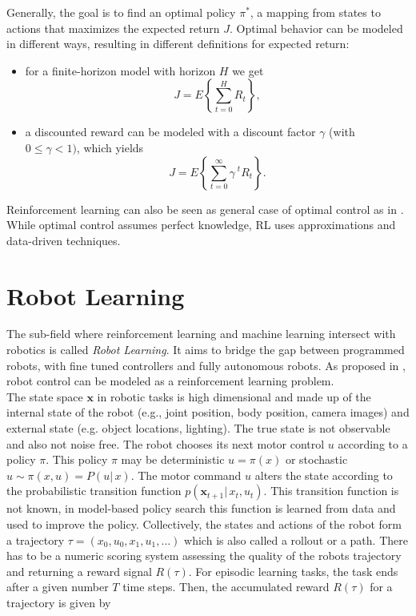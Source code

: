 Generally, the goal is to find an optimal policy $\pi^*$,
a mapping from states to actions that
maximizes the expected return $J$.
Optimal behavior can be modeled in
different ways, resulting in different
definitions for expected return:
\begin{itemize}
\item for a finite-horizon model with horizon $H$ we get
$$ J = E \left\{\sum^H_{t=0} R_t \right\}, $$

\item a discounted reward can be modeled with
  a discount factor $\gamma$ (with $0 \leq \gamma < 1)$, which yields
$$ J = E \left\{\sum^{\infty}_{t=0} \gamma^{\; t} R_t \right\}. $$
\end{itemize}

Reinforcement learning can also be seen as
general case of optimal control as in \citet{sutton1992reinforcement}.
While optimal control assumes perfect knowledge, RL uses approximations
and data-driven techniques.



\section{Robot Learning}
The sub-field where reinforcement learning and machine learning
intersect with robotics is called \textit{Robot Learning}. It aims to bridge
the gap between programmed robots,
with fine tuned controllers  and fully autonomous robots.
As proposed in \citet{deisenroth2013survey}, robot control can be modeled as
a reinforcement learning problem. \\
The state space $\mathbf{x}$ in robotic tasks is high dimensional and
made up of
the internal state of the robot (e.g., joint position, body position,
camera images)
and external state (e.g. object locations, lighting). The true state is
not observable and also not noise free. 
The robot chooses its next motor control $u$ according to a policy $\pi$.
This policy $\pi$ may
be deterministic $u = \pi(x)$ or stochastic $u \sim \pi(x,u) = P(u |\,x)$.
The motor command $u$ alters the state according to the probabilistic
transition function $p(\mathbf{x}_{t+1} |\, x_t, u_t)$.
This transition function
is not known, in model-based policy search this
function is learned from data and
used to improve the policy.
Collectively, the states and actions of the robot form a
trajectory $\tau = (x_0, u_0, x_1, u_1,...)$ which is also called
a rollout or a path.
There has to be a numeric scoring system assessing the quality
of the robots trajectory and returning a reward signal $R(\tau)$.
For episodic learning tasks, the task ends after a given number $T$ time
steps. Then, the accumulated reward $R(\tau)$ for a trajectory is given by

